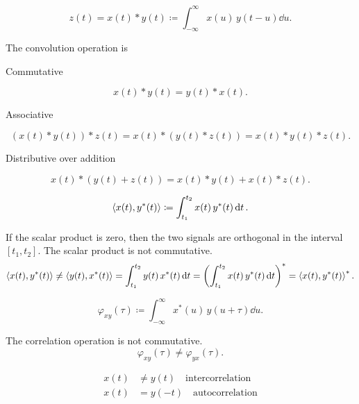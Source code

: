 \documentclass{report}
\newcommand{\scalar}[1]{\lt\langle #1 \rt\rangle}
\begin{document}
\begin{description}
	\ii[Convolution]
	\[
		z(t) = x(t) * y(t) \coloneq \int_{-\infty}^{\infty} x(u)\,y(t-u)\dd{u}
		.\]

	The convolution operation is

	\begin{enumerate}
		\ii Commutative

		\[
			x(t) * y(t) = y(t) * x(t)
			.\]

		\ii Associative

		\[
			(x(t) * y(t)) * z(t) = x(t) * (y(t) * z(t)) = x(t) * y(t) * z(t)
			.\]

		\ii Distributive over addition

		\[
			x(t) * (y(t) + z(t)) = x(t) * y(t) + x(t) * z(t)
			.\]

	\end{enumerate}



	\[
		\scalar{x(t), y^*(t)} \coloneq \int_{t_1}^{t_2} x(t)\, y^*(t) \dd{t}
		.\]

	If the scalar product is zero, then the two signals are orthogonal in the interval $[t_1, t_2]$.
	The scalar product is not commutative.
	\[
		\scalar{x(t), y^*(t)} \neq \scalar{y(t), x^*(t)} = \int_{t_1}^{t_2} y(t)\, x^*(t) \dd{t} = \lt( \int_{t_1}^{t_2} x(t)\, y^*(t) \dd{t} \rt)^* = \scalar{x(t), y^*(t)}^*
		.\]


	\ii[Correlation]

	\[
		\varphi_{xy}(\tau) \coloneq \int_{-\infty}^{\infty} x^*(u)\, y(u+\tau) \dd{u}
		.\]

	The correlation operation is not commutative.
	\[
		\varphi_{xy}(\tau) \neq \varphi_{yx}(\tau)
		.\]

	\begin{align*}
		x(t) & \neq y(t) \quad \text{intercorrelation} \\
		x(t) & = y(-t) \quad \text{autocorrelation}
	\end{align*}
	\nt{
		\[
			\varphi_{xy}(\tau) = x^*(-\tau) * y(\tau)
			.\]
	}
\end{description}
\end{document}

